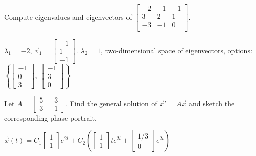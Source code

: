 \begin{exercise}
Compute eigenvalues and eigenvectors of
$\left[ \begin{smallmatrix}
-2 & -1 & -1 \\
3 & 2 & 1 \\
-3 & -1 & 0 \\
\end{smallmatrix} \right]$.
\end{exercise}
\comboSol{%
}
{%
$\lambda_1 = -2$, $\vec{v}_1 = \left[\begin{smallmatrix} -1 \\ 1 \\ -1 \end{smallmatrix}\right]$. $\lambda_2 = 1$, two-dimensional space of eigenvectors, options: $\left\{ \left[\begin{smallmatrix} -1 \\ 0 \\ 3 \end{smallmatrix}\right],\ \left[\begin{smallmatrix} -1 \\ 3 \\ 0 \end{smallmatrix}\right]\right\}$
}

\begin{exercise}
Let
$A = \left[ \begin{smallmatrix} 5 & -3 \\ 3 & -1 \end{smallmatrix} \right]$.
Find the general solution of ${\vec{x}}' = A \vec{x}$ and sketch the corresponding phase portrait.
\end{exercise}
\comboSol{%
}
{%
$\vec{x}(t) = C_1 \left[\begin{smallmatrix}  1\\ 1 \end{smallmatrix}\right]e^{2t} + C_2\left( \left[\begin{smallmatrix} 1\\1 \end{smallmatrix}\right]te^{2t} + \left[\begin{smallmatrix} 1/3 \\ 0 \end{smallmatrix}\right]e^{2t}\right)$ \hfill{}\hfill\hfill
}

